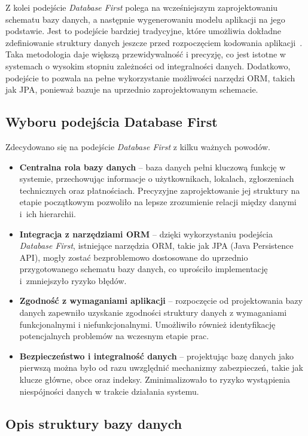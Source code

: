 Z kolei podejście \emph{Database First} polega na wcześniejszym zaprojektowaniu schematu bazy danych, a następnie wygenerowaniu modelu aplikacji na jego podstawie. Jest to podejście bardziej tradycyjne, które umożliwia dokładne zdefiniowanie struktury danych jeszcze przed rozpoczęciem kodowania aplikacji~\cite{DB_FIRST}. Taka metodologia daje większą przewidywalność i precyzję, co jest istotne w systemach o wysokim stopniu zależności od integralności danych. Dodatkowo, podejście to pozwala na pełne wykorzystanie możliwości narzędzi ORM, takich jak JPA, ponieważ bazuje na uprzednio zaprojektowanym schemacie.

\subsection{Wyboru podejścia Database First}

Zdecydowano się na podejście \emph{Database First} z kilku ważnych powodów.
\begin{itemize}
    \item \textbf{Centralna rola bazy danych} -- baza danych pełni kluczową funkcję w systemie, przechowując informacje o użytkownikach, lokalach, zgłoszeniach technicznych oraz płatnościach. Precyzyjne zaprojektowanie jej struktury na etapie początkowym pozwoliło na lepsze zrozumienie relacji między danymi i~ich hierarchii.
    \item \textbf{Integracja z narzędziami ORM} -- dzięki wykorzystaniu podejścia \emph{Database First}, istniejące narzędzia ORM, takie jak JPA (Java Persistence API), mogły zostać bezproblemowo dostosowane do uprzednio przygotowanego schematu bazy danych, co uprościło implementację i~zmniejszyło ryzyko błędów.
    \item \textbf{Zgodność z wymaganiami aplikacji} -- rozpoczęcie od projektowania bazy danych zapewniło uzyskanie zgodności struktury danych z wymaganiami funkcjonalnymi i niefunkcjonalnymi. Umożliwiło również identyfikację potencjalnych problemów na wczesnym etapie prac.
    \item \textbf{Bezpieczeństwo i integralność danych} -- projektując bazę danych jako pierwszą można było od razu uwzględnić mechanizmy zabezpieczeń, takie jak klucze główne, obce oraz indeksy. Zminimalizowało to ryzyko wystąpienia niespójności danych w trakcie działania systemu.
\end{itemize}

\subsection{Opis struktury bazy danych}

